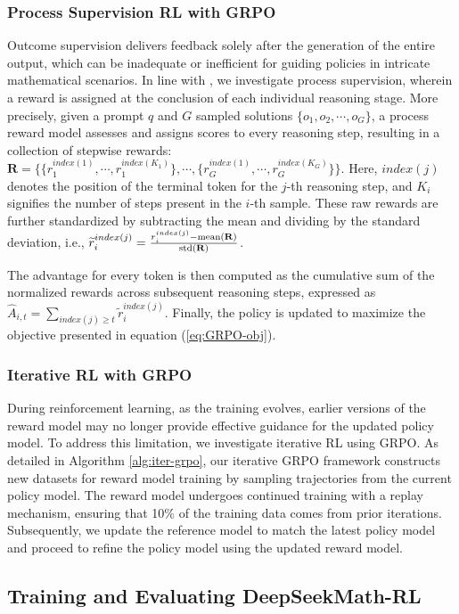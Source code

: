 \begin{itemize}[topsep=0pt]
\begin{itemize}[topsep=0pt]
\subsubsection{Process Supervision RL with GRPO} Outcome supervision delivers feedback solely after the generation of the entire output, which can be inadequate or inefficient for guiding policies in intricate mathematical scenarios. In line with \cite{wang2023math}, we investigate process supervision, wherein a reward is assigned at the conclusion of each individual reasoning stage. More precisely, given a prompt $q$ and $G$ sampled solutions $\{o_1, o_2, \cdots, o_G\}$, a process reward model assesses and assigns scores to every reasoning step, resulting in a collection of stepwise rewards: $\mathbf{R} = \{ \{r_1^{index(1)},\cdots,r_1^{index(K_1)}\}, \cdots,  \{r_G^{index(1)},\cdots,r_G^{index(K_G)}\} \}$. Here, $index(j)$ denotes the position of the terminal token for the $j$-th reasoning step, and $K_i$ signifies the number of steps present in the $i$-th sample. These raw rewards are further standardized by subtracting the mean and dividing by the standard deviation, i.e., $\widetilde{r}_i^{index(j)} = \frac{r_i^{index(j)} - {\rm mean(\mathbf{R})}}{{\rm std(\mathbf{R})}}$.

The advantage for every token is then computed as the cumulative sum of the normalized rewards across subsequent reasoning steps, expressed as $\hat{A}_{i, t} = \sum_{index(j) \ge t} \widetilde{r}_i^{index(j)}$. Finally, the policy is updated to maximize the objective presented in equation (\ref{eq:GRPO-obj}).

\subsubsection{Iterative RL with GRPO} During reinforcement learning, as the training evolves, earlier versions of the reward model may no longer provide effective guidance for the updated policy model. To address this limitation, we investigate iterative RL using GRPO. As detailed in Algorithm \ref{alg:iter-grpo}, our iterative GRPO framework constructs new datasets for reward model training by sampling trajectories from the current policy model. The reward model undergoes continued training with a replay mechanism, ensuring that 10\% of the training data comes from prior iterations. Subsequently, we update the reference model to match the latest policy model and proceed to refine the policy model using the updated reward model.

\subsection{Training and Evaluating DeepSeekMath-RL}


\end{itemize}
\end{itemize}
